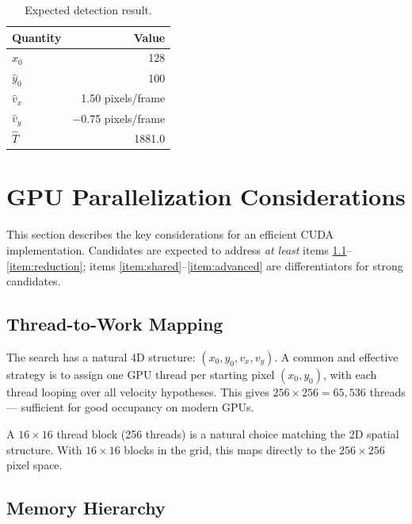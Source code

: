 \documentclass[11pt,letterpaper]{article}
\begin{document}
\begin{table}[h]
\centering
\caption{Expected detection result.}
\begin{tabular}{@{}lr@{}}
\toprule
\textbf{Quantity} & \textbf{Value} \\
\midrule
$\hat{x}_0$    & 128 \\
$\hat{y}_0$    & 100 \\
$\hat{v}_x$    & 1.50 pixels/frame \\
$\hat{v}_y$    & $-$0.75 pixels/frame \\
$\hat{T}$      & 1881.0 \\
\bottomrule
\end{tabular}
\end{table}

\section{GPU Parallelization Considerations}
\label{sec:gpu}

This section describes the key considerations for an efficient CUDA
implementation. Candidates are expected to address \emph{at least} items
\ref{item:thread_map}--\ref{item:reduction}; items
\ref{item:shared}--\ref{item:advanced} are differentiators for strong
candidates.

\subsection{Thread-to-Work Mapping}
\label{item:thread_map}

The search has a natural 4D structure: $(x_0, y_0, v_x, v_y)$. A common
and effective strategy is to assign one GPU thread per starting pixel
$(x_0, y_0)$, with each thread looping over all velocity hypotheses.
This gives $256 \times 256 = 65{,}536$ threads --- sufficient for good
occupancy on modern GPUs.

\begin{notebox}
A $16 \times 16$ thread block (256 threads) is a natural choice matching
the 2D spatial structure. With $16 \times 16$ blocks in the grid, this
maps directly to the $256 \times 256$ pixel space.
\end{notebox}

\subsection{Memory Hierarchy}
\label{item:memory}
\end{document}
